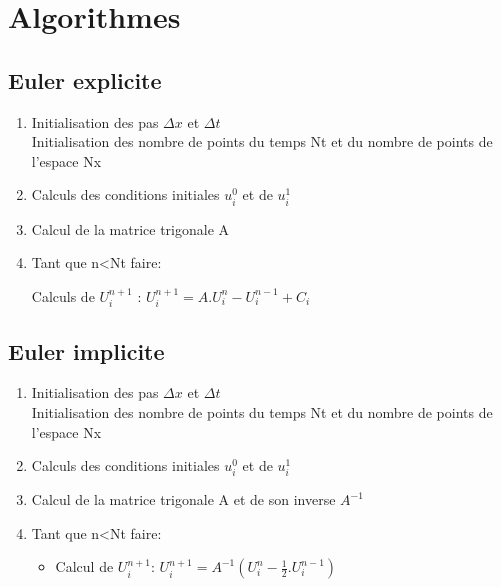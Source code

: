 \section{Algorithmes}
\subsection{Euler explicite}
\begin{enumerate}
    \item Initialisation des pas $\Delta x$ et $\Delta t$\\
    Initialisation des nombre de points du temps Nt et du nombre de points de l'espace Nx
    
    \item Calculs des conditions initiales $u^0_i$ et de $u^1_i$
    
    \item Calcul de la matrice trigonale A
    
    \item Tant que n<Nt faire:
        \begin{itemize}
        Calculs de $U^{n+1}_i$ : $U^{n+1}_i = A.U^{n}_i - U^{n-1}_i + C_i$\\

        
        \end{itemize}
    

\end{enumerate}

\subsection{Euler implicite}
\begin{enumerate}
    \item Initialisation des pas $\Delta x$ et $\Delta t$\\
    Initialisation des nombre de points du temps Nt et du nombre de points de l'espace Nx
    
    \item Calculs des conditions initiales $u^0_i$ et de $u^1_i$
    
    \item Calcul de la matrice trigonale A et de son inverse $A^{-1}$
    
    \item Tant que n<Nt faire:\\
        \begin{itemize}
            \item Calcul de $U^{n+1}_i$: $U^{n+1}_i = A^{-1}(U^{n}_i - \frac{1}{2}.U^{n-1}_i)$
        \end{itemize}
    
\end{enumerate}

